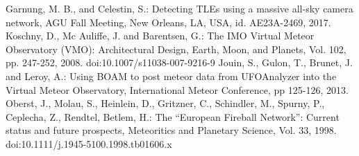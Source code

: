 \documentclass[10pt,twocolumn]{article}
\begin{document}
\begin{thebibliography}{}
Garnung, M. B., and Celestin, S.: Detecting TLEs using a massive all-sky camera network, AGU Fall Meeting, New Orleans, LA, USA, id. AE23A-2469, 2017.
Koschny, D., Mc Auliffe, J. and Barentsen, G.: The IMO Virtual Meteor Observatory (VMO): Architectural Design, Earth, Moon, and Planets, Vol. 102, pp. 247-252, 2008. doi:10.1007/s11038-007-9216-9
Jouin, S., Gulon, T., Brunet, J. and Leroy, A.: Using BOAM to post meteor data from UFOAnalyzer into the Virtual Meteor Observatory, International Meteor Conference, pp 125-126, 2013.
Oberst, J., Molau, S., Heinlein, D., Gritzner, C., Schindler, M., Spurny, P., Ceplecha, Z., Rendtel, Betlem, H.: The ``European Fireball Network'': Current status and future prospects, Meteoritics and Planetary Science, Vol. 33, 1998. doi:10.1111/j.1945-5100.1998.tb01606.x
\end{thebibliography}
\end{document}
